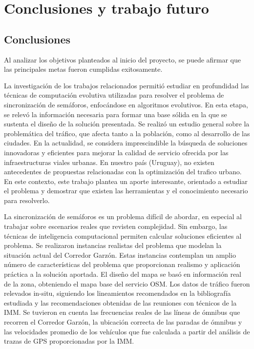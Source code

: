 \chapter{Conclusiones y trabajo futuro}

\section{Conclusiones}
Al analizar los objetivos planteados al inicio del proyecto, se puede afirmar que las principales metas fueron cumplidas exitosamente.

La investigación de los trabajos relacionados permitió estudiar en profundidad las técnicas de computación evolutiva utilizadas para resolver el problema de sincronización de semáforos, enfocándose en algoritmos evolutivos. En esta etapa, se relevó la información necesaria para formar una base sólida en la que se sustenta el diseño de la solución presentada. Se realizó un estudio general sobre la problemática del tráfico, que afecta tanto a la población, como al desarrollo de las ciudades. En la actualidad, se considera imprescindible la búsqueda de soluciones innovadoras y eficientes para mejorar la calidad de servicio ofrecida por las infraestructuras viales urbanas. En nuestro país (Uruguay), no existen antecedentes de propuestas relacionadas con la optimización del trafico urbano. En este contexto, este trabajo plantea un aporte interesante, orientado a estudiar el problema y demostrar que existen las herramientas y el conocimiento necesario para resolverlo.

La sincronización de semáforos es un problema difícil de abordar, en especial al trabajar sobre escenarios reales que revisten complejidad. Sin embargo, las técnicas de inteligencia computacional permiten calcular soluciones eficientes al problema. Se realizaron instancias realistas del problema que modelan la situación actual del Corredor Garzón. Estas instancias contemplan un amplio número de características del problema que proporcionan realismo y aplicación práctica a la solución aportada. El diseño del mapa se basó en información real de la zona, obteniendo el mapa base del servicio OSM. Los datos de tráfico fueron relevados in-situ, siguiendo los lineamientos recomendados en la bibliografía estudiada y las recomendaciones obtenidas de las reuniones con técnicos de la IMM. Se tuvieron en cuenta las frecuencias reales de las líneas de ómnibus que recorren el Corredor Garzón, la ubicación correcta de las paradas de ómnibus y las velocidades promedio de los vehículos que fue calculada a partir del análisis de trazas de GPS proporcionadas por la IMM.
 

